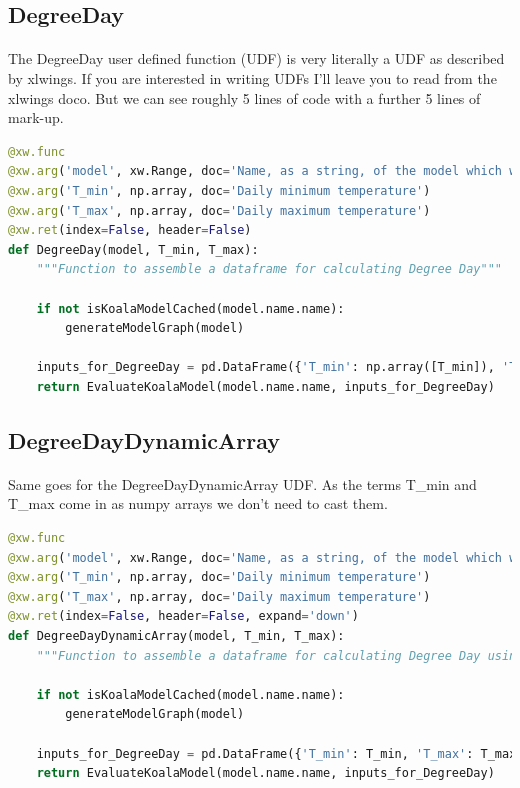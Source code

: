 \documentclass[12pt,a4paper,twoside,openright,titlepage]{article}
\begin{document}
\subsection{DegreeDay}

\paragraph{} The DegreeDay user defined function (UDF) is very literally a UDF as described by xlwings. If you are interested in writing UDFs I'll leave you to read from the xlwings doco. But we can see roughly 5 lines of code with a further 5 lines of mark-up.

\begin{lstlisting}[language=Python]
@xw.func
@xw.arg('model', xw.Range, doc='Name, as a string, of the model which will be evaluated. The Excel cell name / named range')
@xw.arg('T_min', np.array, doc='Daily minimum temperature')
@xw.arg('T_max', np.array, doc='Daily maximum temperature')
@xw.ret(index=False, header=False)
def DegreeDay(model, T_min, T_max):
    """Function to assemble a dataframe for calculating Degree Day"""

    if not isKoalaModelCached(model.name.name):
        generateModelGraph(model)

    inputs_for_DegreeDay = pd.DataFrame({'T_min': np.array([T_min]), 'T_max': np.array([T_max])})
    return EvaluateKoalaModel(model.name.name, inputs_for_DegreeDay)
\end{lstlisting}

\subsection{DegreeDayDynamicArray}

\paragraph{} Same goes for the DegreeDayDynamicArray UDF. As the terms T\_min and T\_max come in as numpy arrays we don't need to cast them.

\begin{lstlisting}[language=Python]
@xw.func
@xw.arg('model', xw.Range, doc='Name, as a string, of the model which will be evaluated. The Excel cell name / named range.')
@xw.arg('T_min', np.array, doc='Daily minimum temperature')
@xw.arg('T_max', np.array, doc='Daily maximum temperature')
@xw.ret(index=False, header=False, expand='down')
def DegreeDayDynamicArray(model, T_min, T_max):
    """Function to assemble a dataframe for calculating Degree Day using dynamic arrays"""

    if not isKoalaModelCached(model.name.name):
        generateModelGraph(model)

    inputs_for_DegreeDay = pd.DataFrame({'T_min': T_min, 'T_max': T_max})
    return EvaluateKoalaModel(model.name.name, inputs_for_DegreeDay)
\end{lstlisting}
\end{document}
